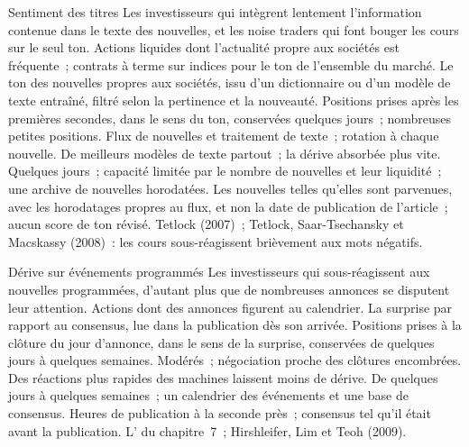 \begin{strategyfile}{Sentiment des titres}\label{strat:s1:news-and-events:sentiment}
 Les investisseurs qui intègrent lentement l'information contenue dans le texte des nouvelles, et les noise traders qui font bouger les cours sur le seul ton.
 Actions liquides dont l'actualité propre aux sociétés est fréquente~; contrats à terme sur indices pour le ton de l'ensemble du marché.
 Le ton des nouvelles propres aux sociétés, issu d'un dictionnaire ou d'un modèle de texte entraîné, filtré selon la pertinence et la nouveauté.
 Positions prises après les premières secondes, dans le sens du ton, conservées quelques jours~; nombreuses petites positions.
 Flux de nouvelles et traitement de texte~; rotation à chaque nouvelle.
 De meilleurs modèles de texte partout~; la dérive absorbée plus vite.
 Quelques jours~; capacité limitée par le nombre de nouvelles et leur liquidité~; une archive de nouvelles horodatées.
 Les nouvelles telles qu'elles sont parvenues, avec les horodatages propres au flux, et non la date de publication de l'article~; aucun score de ton révisé.
 Tetlock (2007)~; Tetlock, Saar-Tsechansky et Macskassy (2008)~: les cours sous-réagissent brièvement aux mots négatifs.
\end{strategyfile}

\begin{strategyfile}{Dérive sur événements programmés}\label{strat:s1:news-and-events:scheduled}
 Les investisseurs qui sous-réagissent aux nouvelles programmées, d'autant plus que de nombreuses annonces se disputent leur attention.
 Actions dont des annonces figurent au calendrier.
 La surprise par rapport au consensus, lue dans la publication dès son arrivée.
 Positions prises à la clôture du jour d'annonce, dans le sens de la surprise, conservées de quelques jours à quelques semaines.
 Modérés~; négociation proche des clôtures encombrées.
 Des réactions plus rapides des machines laissent moins de dérive.
 De quelques jours à quelques semaines~; un calendrier des événements et une base de consensus.
 Heures de publication à la seconde près~; consensus tel qu'il était avant la publication.
 L' du chapitre~7~; Hirshleifer, Lim et Teoh (2009).
\end{strategyfile}

